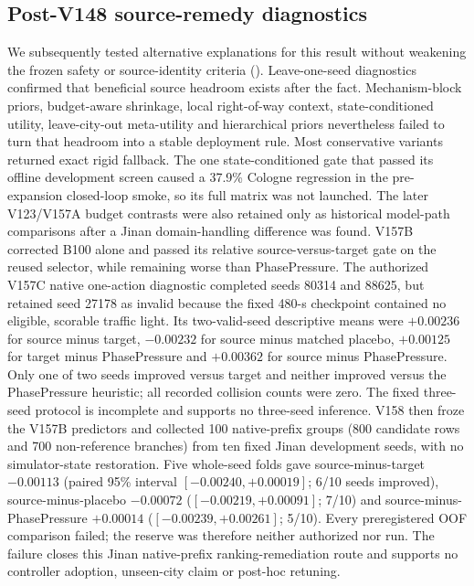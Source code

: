 \subsection{Post-V148 source-remedy diagnostics}
\label{sec:supp-source-remedy}

We subsequently tested alternative explanations for this result
without weakening the frozen safety or source-identity criteria
().  Leave-one-seed diagnostics confirmed that
beneficial source headroom exists after the fact.  Mechanism-block priors,
budget-aware shrinkage, local right-of-way context, state-conditioned utility,
leave-city-out meta-utility and hierarchical priors nevertheless failed to
turn that headroom into a stable deployment rule.  Most conservative variants
returned exact rigid fallback.  The one state-conditioned gate that passed its
offline development screen caused a 37.9\% Cologne regression in the
pre-expansion closed-loop smoke, so its full matrix was not launched.
The later V123/V157A budget contrasts were also retained only as historical
model-path comparisons after a Jinan domain-handling difference was found.
V157B corrected B100 alone and passed its relative source-versus-target gate on
the reused selector, while remaining worse than PhasePressure.  The authorized
V157C native one-action diagnostic completed seeds 80314 and 88625, but retained
seed 27178 as invalid because the fixed 480-s checkpoint contained no eligible,
scorable traffic light.  Its two-valid-seed descriptive means were $+0.00236$
for source minus target, $-0.00232$ for source minus matched placebo, $+0.00125$
for target minus PhasePressure and $+0.00362$ for source minus PhasePressure.
Only one of two seeds improved versus target and neither improved versus the
PhasePressure heuristic; all recorded collision counts were zero.  The fixed
three-seed protocol is incomplete and supports no three-seed inference.
V158 then froze the V157B predictors and collected 100 native-prefix groups
(800 candidate rows and 700 non-reference branches) from ten fixed Jinan
development seeds, with no simulator-state restoration.  Five whole-seed folds
gave source-minus-target $-0.00113$ (paired 95\% interval
$[-0.00240,+0.00019]$; 6/10 seeds improved), source-minus-placebo $-0.00072$
($[-0.00219,+0.00091]$; 7/10) and source-minus-PhasePressure $+0.00014$
($[-0.00239,+0.00261]$; 5/10).  Every preregistered OOF
comparison failed;
the reserve was therefore neither authorized nor run.  The failure closes this
Jinan native-prefix ranking-remediation route and supports no controller
adoption, unseen-city claim or post-hoc retuning.

